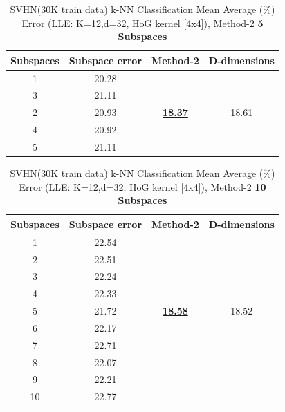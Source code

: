 \begin{table}[H]
\centering
\label{tab:table16}
\begin{tabular}{|c|c|c|c|}
\hline
\textlatin{Subspaces} & \textlatin{Subspace error} & \textlatin{Method-2} & \textlatin{D-dimensions}  \\
\hline
1 & 20.28 & & \\
3 & 21.11 & & \\
2 & 20.93 & \underline{\textbf{18.37}} & 18.61 \\
4 & 20.92 & & \\
5 & 21.11 & & \\
\hline
\end{tabular}
\caption{\textlatin{SVHN(30K train data) k-NN Classification Mean Average (\%) Error (LLE: K=12,d=32, HoG kernel [4x4]), Method-2 \textbf{5 Subspaces}}}
\end{table}

\begin{table}[H]
\centering
\label{tab:table17}
\begin{tabular}{|c|c|c|c|}
\hline
\textlatin{Subspaces} & \textlatin{Subspace error} & \textlatin{Method-2} & \textlatin{D-dimensions}  \\
\hline
1 & 22.54 & & \\
2 & 22.51 & & \\
3 & 22.24 & & \\
4 & 22.33 & & \\
5 & 21.72 & \underline{\textbf{18.58}} & 18.52 \\
6 & 22.17 & & \\
7 & 22.71 & & \\
8 & 22.07 & & \\
9 & 22.21 & & \\
10 & 22.77 & & \\
\hline
\end{tabular}
\caption{\textlatin{SVHN(30K train data) k-NN Classification Mean Average (\%) Error (LLE: K=12,d=32, HoG kernel [4x4]), Method-2 \textbf{10 Subspaces}}}
\end{table}

